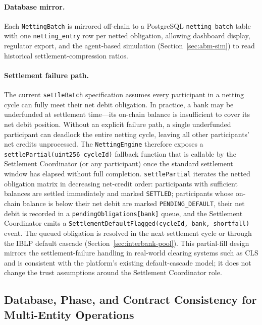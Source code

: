 \documentclass[12pt,a4paper]{report}
\begin{document}
\paragraph{Database mirror.}
Each \texttt{NettingBatch} is mirrored off-chain to a PostgreSQL \texttt{netting\_batch} table with one \texttt{netting\_entry} row per netted obligation, allowing dashboard display, regulator export, and the agent-based simulation (Section~\ref{sec:abm-sim}) to read historical settlement-compression ratios.

\paragraph{Settlement failure path.}
The current \texttt{settleBatch} specification assumes every participant in a netting cycle can fully meet their net debit obligation.  In practice, a bank may be underfunded at settlement time---its on-chain balance is insufficient to cover its net debit position.  Without an explicit failure path, a single underfunded participant can deadlock the entire netting cycle, leaving all other participants' net credits unprocessed.  The \texttt{NettingEngine} therefore exposes a \texttt{settlePartial(uint256 cycleId)} fallback function that is callable by the Settlement Coordinator (or any participant) once the standard settlement window has elapsed without full completion.  \texttt{settlePartial} iterates the netted obligation matrix in decreasing net-credit order: participants with sufficient balances are settled immediately and marked \texttt{SETTLED}; participants whose on-chain balance is below their net debit are marked \texttt{PENDING\_DEFAULT}, their net debit is recorded in a \texttt{pendingObligations[bank]} queue, and the Settlement Coordinator emits a \texttt{SettlementDefaultFlagged(cycleId, bank, shortfall)} event.  The queued obligation is resolved in the next settlement cycle or through the IBLP default cascade (Section~\ref{sec:interbank-pool}).  This partial-fill design mirrors the settlement-failure handling in real-world clearing systems such as CLS and is consistent with the platform's existing default-cascade model; it does not change the trust assumptions around the Settlement Coordinator role.

\subsection{Database, Phase, and Contract Consistency for Multi-Entity Operations}
\label{sec:multi-entity-consistency}
\end{document}
